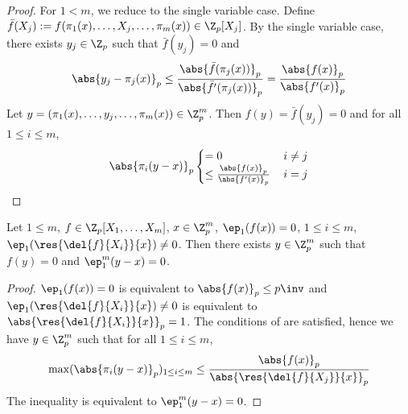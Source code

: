 \begin{proof}
  For $1 < m$, we reduce to the single variable case. 
  Define $\bar{f}(X_j) := f(\pi_1(x),\dots,X_j,\dots,\pi_m(x)) \in \Z_p[X_j]$.
  By the single variable case,
  there exists $y_j \in \Z_p$ such that $\bar{f}(y_j) = 0$ and 
  \[
    \abs{y_j - \pi_j(x)}_p 
    \leq \frac{\abs{\bar{f}(\pi_j(x))}_p}{\abs{\bar{f}'(\pi_j(x))}_p}
    = \frac{\abs{f(x)}_p}{\abs{{f}'(x)}_p}
  \]
  Let $y = (\pi_1(x),\dots,y_j,\dots,\pi_m(x))\in \Z_p^m$.
  Then $f(y) = \bar{f}(y_j) = 0$ and for all $1 \leq i \leq m$,
  \[
    \abs{\pi_i(y - x)}_p \begin{cases}
      = 0 &\, i \neq j \\
      \leq \frac{\abs{f(x)}_p}{\abs{f'(x)}_p} &\, i = j
    \end{cases} 
  \]
\end{proof}

\begin{prop}
  
  Let $1 \leq m$, $f \in \Z_p[X_1,\dots,X_m]$, $x \in \Z_p^m$, 
  $\ep_1(f(x)) = 0$, $1 \leq i \leq m$, $\ep_1(\res{\del{f}{X_i}}{x}) \neq 0$.
  Then there exists $y \in \Z_p^m$ such that 
  $f(y) = 0$ and $\ep_1^m(y - x) = 0$. 
\end{prop}
\begin{proof}
  $\ep_1(f(x)) = 0$ is equivalent to $\abs{f(x)}_p \leq p\inv$
  and $\ep_1(\res{\del{f}{X_i}}{x}) \neq 0$ is equivalent to 
  $\abs{\res{\del{f}{X_i}}{x}}_p = 1$.
  The conditions of  are satisfied,
  hence we have $y \in \Z_p^m$ such that for all $1 \leq i \leq m$, 
  \[
    \max(\abs{\pi_i(y - x)}_p)_{1\leq i \leq m} 
    \leq \frac{\abs{f(x)}_p}{\abs{\res{\del{f}{X_j}}{x}}_p}
  \]
  The inequality is equivalent to $\ep_1^m(y - x) = 0$. 
\end{proof}

